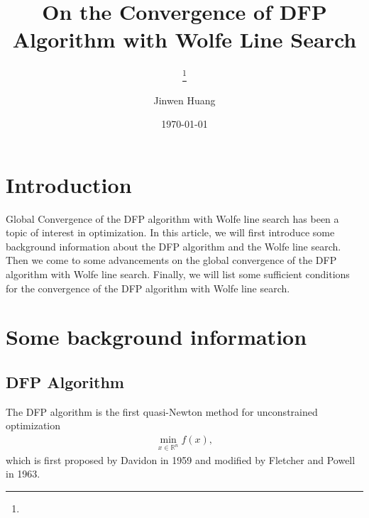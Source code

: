 \documentclass[12pt,a4paper,draft]{article}  %
\title{ }
\date{\DTMnow}
\author{
    \thanks{}
}
\newcounter{cite}
\theoremstyle{definition}
\numberwithin{equation}{section}
\newcommand{\RR}{\mathbb{R}}
\begin{document}
\title{On the Convergence of DFP Algorithm with Wolfe Line Search}
\author{Jinwen Huang}
\date{\today}

\maketitle








\tableofcontents

\section{Introduction}
Global Convergence of the DFP algorithm with Wolfe line search has been a topic of interest in optimization. 
In this article, we will first introduce some background information about the DFP algorithm and the Wolfe line search. 
Then we come to some advancements on the global convergence of the DFP algorithm with Wolfe line search.
Finally, we will list some sufficient conditions for the convergence of the DFP algorithm with Wolfe line search. 



\section{Some background information}

\subsection{DFP Algorithm}
The DFP algorithm is the first quasi-Newton method for unconstrained optimization
\begin{align*}
\min_{x \in \RR^n} f(x), \tag{1.1}
\end{align*}
which is first proposed by Davidon\cite{Da} in 1959 and modified by Fletcher and Powell\cite{FP} in 1963.
\end{document}
